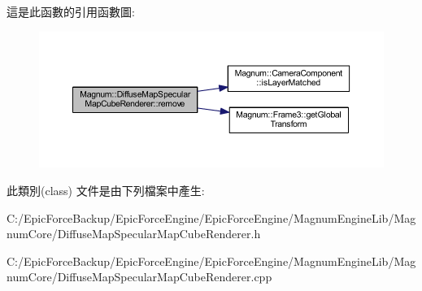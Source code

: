 這是此函數的引用函數圖\+:\nopagebreak
\begin{figure}[H]
\begin{center}
\leavevmode
\includegraphics[width=350pt]{class_magnum_1_1_diffuse_map_specular_map_cube_renderer_a1f74a1a086edaa7c142682c2b8648678_cgraph}
\end{center}
\end{figure}




此類別(class) 文件是由下列檔案中產生\+:\begin{DoxyCompactItemize}
\item 
C\+:/\+Epic\+Force\+Backup/\+Epic\+Force\+Engine/\+Epic\+Force\+Engine/\+Magnum\+Engine\+Lib/\+Magnum\+Core/Diffuse\+Map\+Specular\+Map\+Cube\+Renderer.\+h\item 
C\+:/\+Epic\+Force\+Backup/\+Epic\+Force\+Engine/\+Epic\+Force\+Engine/\+Magnum\+Engine\+Lib/\+Magnum\+Core/Diffuse\+Map\+Specular\+Map\+Cube\+Renderer.\+cpp\end{DoxyCompactItemize}
